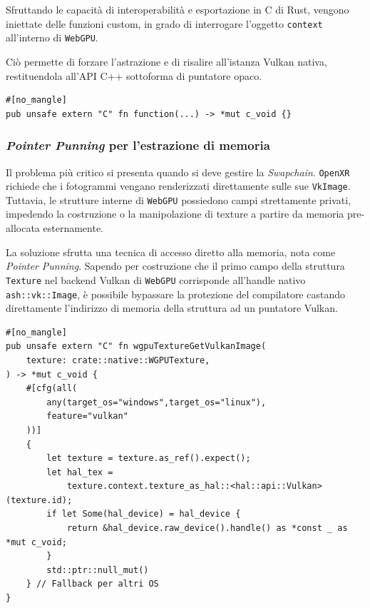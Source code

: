 \documentclass[a4paper, 11pt, twoside]{report}
\begin{document}
Sfruttando le capacità di interoperabilità e esportazione in C di Rust, vengono iniettate delle funzioni custom, in
grado di interrogare l'oggetto \texttt{context} all'interno di \texttt{WebGPU}.

\noindent Ciò permette di forzare l'astrazione e di risalire all'istanza \gls{Vulkan} nativa, restituendola all'API C++
sottoforma di puntatore opaco.

\begin{listing}[!ht]
\begin{verbatim}
#[no_mangle]
pub unsafe extern "C" fn function(...) -> *mut c_void {}
\end{verbatim}
\vspace{-0.75cm}
\caption{Esempio di FFI in Rust}
\label{listing:ffiex}
\end{listing}
\vspace{-0.75cm}

\subsubsection{\textit{Pointer Punning} per l'estrazione di memoria}

Il problema più critico si presenta quando si deve gestire la \textit{\gls{Swapchain}}. \texttt{\gls{OpenXR}} richiede
che i fotogrammi vengano renderizzati direttamente sulle sue \texttt{VkImage}.
Tuttavia, le strutture interne di \texttt{WebGPU} possiedono campi strettamente privati, impedendo la costruzione o la
manipolazione di texture a partire da memoria pre-allocata esternamente.

La soluzione sfrutta una tecnica di accesso diretto alla memoria, nota come \textit{Pointer Punning}.
Sapendo per costruzione che il primo campo della struttura \texttt{Texture} nel backend \gls{Vulkan} di \texttt{WebGPU}
corrisponde all'handle nativo \texttt{ash::vk::Image}, è possibile bypassare la protezione del compilatore castando
direttamente l'indirizzo di memoria della struttura ad un puntatore \gls{Vulkan}.

\begin{listing}[!ht]
\begin{verbatim}
#[no_mangle]
pub unsafe extern "C" fn wgpuTextureGetVulkanImage(
    texture: crate::native::WGPUTexture,
) -> *mut c_void {
    #[cfg(all(
        any(target_os="windows",target_os="linux"),
        feature="vulkan"
    ))]
    {
        let texture = texture.as_ref().expect();
        let hal_tex = 
            texture.context.texture_as_hal::<hal::api::Vulkan>(texture.id);
        if let Some(hal_device) = hal_device {
            return &hal_device.raw_device().handle() as *const _ as *mut c_void;
        }
        std::ptr::null_mut()
    } // Fallback per altri OS
}
\end{verbatim}
\vspace{-0.75cm}
\caption{Estrazione di una \texttt{VkImage}}
\label{listing:vkimagepunning}
\end{listing}
\vspace{-0.75cm}
\end{document}
